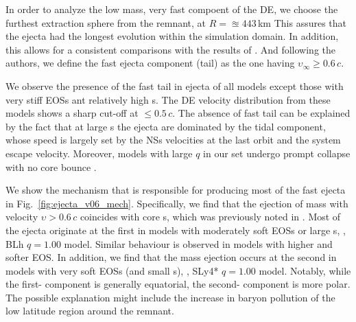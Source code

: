 In order to analyze the low mass, very fast compoent of the \ac{DE}, we 
choose the furthest extraction sphere from the remnant, at 
$R=\approxeq443\,$km %
This assures that the ejecta had the longest evolution 
within the simulation domain. In addition, this allows for a consistent
comparisons with the results of \citet{Radice:2018pdn}.
%
And following the authors, we define the fast ejecta component (tail) 
as the one having $\upsilon_{\infty}\geq0.6\,c$.

We observe the presence of the fast tail in ejecta of all models except those 
with very stiff \acp{EOS} ant relatively high \mr{}s.
The \ac{DE} velocity distribution from these models shows a sharp cut-off at ${\leq}0.5\,c$.
The absence of fast tail can be explained by the fact that 
at large \mr{}s the ejecta are dominated by the tidal component, whose speed 
is largely set by the \acp{NS} velocities at the last orbit and the system escape velocity.
Moreover, models with large $q$ in our set undergo prompt collapse 
with no core bounce \citep{Bernuzzi:2020txg}.

We show the mechanism that is responsible for producing most of the fast ejecta in 
Fig.~\ref{fig:ejecta_v06_mech}. Specifically, we find that the 
ejection of mass with velocity $\upsilon>0.6\,c$ coincides with core \bnc{}s, 
which was previously noted in \citet{Radice:2018pdn}.
Most of the ejecta originate at the first \bnc{} in models with moderately soft \acp{EOS} 
or large \mr{}s, \eg, BLh $q=1.00$ model. %
Similar behaviour is observed in models with higher \mr{} and softer \ac{EOS}. 
In addition, we find that the mass ejection occurs at the second \bnc{} in models
with very soft \acp{EOS} (and small \mr{}s), \eg, 
SLy4* $q=1.00$ model.
Notably, while the first-\bnc{} component is generally equatorial, the second-\bnc{} component 
is more polar. The possible explanation might include the increase in baryon pollution
of the low latitude region around the \pmerg{} remnant.

